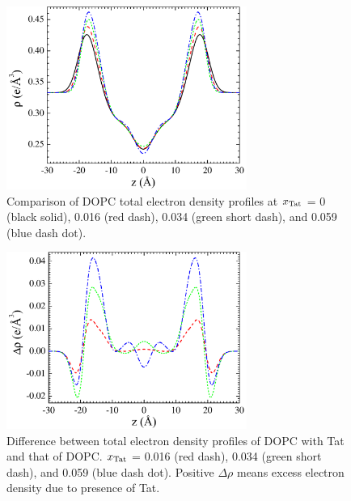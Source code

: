\begin{figure}[htbp]
  \centering
  \includegraphics[width=0.7\textwidth]{figures/Tat/SDP_Results/EDP/DOPC_Tat_total_EDP}
  \caption[Comparison of DOPC total electron density profiles at $\xTat$ = 0 (black solid),
  0.016 (red dash), 0.034 (green short dash), and 0.059 (blue dash dot)]
  {Comparison of DOPC total electron density profiles at $\xTat$ = 0 (black solid),
  0.016 (red dash), 0.034 (green short dash), and 0.059 (blue dash dot).}
  \label{fig:DOPC_Tat_total_EDP}
\end{figure}

\begin{figure}[htbp]
  \centering
  \includegraphics[width=0.7\textwidth]{figures/Tat/SDP_Results/EDP/DOPC_Tat_total_EDP_diff}
  \caption[Difference between total electron density profiles of DOPC with Tat 
  and that of DOPC]{Difference between total electron density profiles of DOPC with Tat 
  and that of DOPC. $\xTat$ = 0.016 (red dash), 0.034 (green short dash), 
  and 0.059 (blue dash dot). Positive $\Delta\rho$ means excess electron density 
  due to presence of Tat.}
  \label{fig:DOPC_Tat_total_EDP_difference}
\end{figure}

